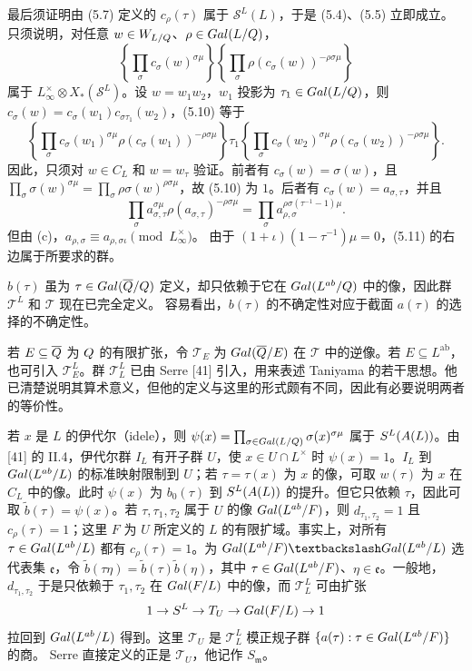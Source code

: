 最后须证明由 (5.7) 定义的 $c_\rho(\tau)$ 属于 $\mathcal S^L(L)$，于是 (5.4)、(5.5) 立即成立。只须说明，对任意
$w\in W_{L/Q}$、$\rho\in Gal(L/Q)$，
\begin{equation}
\left\{\prod_\sigma c_\sigma(w)^{\sigma\mu}\right\}
\left\{\prod_\sigma\rho(c_\sigma(w))^{-\rho\sigma\mu}\right\}
\tag{5.10}
\end{equation}
属于 $L_\infty^\times\otimes X_*(\mathcal S^L)$。设 $w=w_1w_2$，$w_1$ 投影为
$\tau_1\in Gal(L/Q)$，则 $c_\sigma(w)=c_\sigma(w_1)c_{\sigma\tau_1}(w_2)$，(5.10) 等于
\[
\left\{\prod_\sigma c_\sigma(w_1)^{\sigma\mu}
\rho(c_\sigma(w_1))^{-\rho\sigma\mu}\right\}
\tau_1\left\{\prod_\sigma c_\sigma(w_2)^{\sigma\mu}
\rho(c_\sigma(w_2))^{-\rho\sigma\mu}\right\}.
\]
因此，只须对 $w\in C_L$ 和 $w=w_\tau$ 验证。前者有
$c_\sigma(w)=\sigma(w)$，且
$\prod_\sigma\sigma(w)^{\sigma\mu}=\prod_\sigma\rho\sigma(w)^{\rho\sigma\mu}$，故 (5.10) 为
$1$。后者有 $c_\sigma(w)=a_{\sigma,\tau}$，并且
\begin{equation}
\prod_\sigma a_{\sigma,\tau}^{\sigma\mu}
\rho(a_{\sigma,\tau})^{-\rho\sigma\mu}
=\prod_\sigma a_{\rho,\sigma}^{\rho\sigma(\tau^{-1}-1)\mu}.\tag{5.11}
\end{equation}
但由 (c)，$a_{\rho,\sigma}\equiv a_{\rho,\sigma\iota}\pmod{L_\infty^\times}$。
由于 $(1+\iota)(1-\tau^{-1})\mu=0$，(5.11) 的右边属于所要求的群。

$b(\tau)$ 虽为 $\tau\in Gal(\overline{Q}/Q)$ 定义，却只依赖于它在
$Gal(L^{ab}/Q)$ 中的像，因此群 $\mathcal T^L$ 和 $\mathcal T$ 现在已完全定义。
容易看出，$b(\tau)$ 的不确定性对应于截面 $a(\tau)$ 的选择的不确定性。

若 $E\subseteq\overline{Q}$ 为 $Q$ 的有限扩张，令 $\mathcal T_E$ 为
$Gal(\overline{Q}/E)$ 在 $\mathcal T$ 中的逆像。若 $E\subseteq L^{\mathrm{ab}}$，也可引入
$\mathcal T_E^L$。群 $\mathcal T_L^L$ 已由 Serre [41] 引入，用来表述 Taniyama 的若干思想。他已清楚说明其算术意义，但他的定义与这里的形式颇有不同，因此有必要说明两者的等价性。

若 $x$ 是 $L$ 的伊代尔（idele），则
$\psi(x)=\prod_{\sigma\in Gal(L/Q)}\sigma(x)^{\sigma\mu}$ 属于
$S^L(A(L))$。由 [41] 的 II.4，伊代尔群 $I_L$ 有开子群 $U$，使
$x\in U\cap L^\times$ 时 $\psi(x)=1$。$I_L$ 到 $Gal(L^{ab}/L)$ 的标准映射限制到
$U$；若 $\tau=\tau(x)$ 为 $x$ 的像，可取 $w(\tau)$ 为 $x$ 在 $C_L$ 中的像。此时
$\psi(x)$ 为 $b_0(\tau)$ 到 $S^L(A(L))$ 的提升。但它只依赖 $\tau$，因此可取
$\widetilde b(\tau)=\psi(x)$。若 $\tau,\tau_1,\tau_2$ 属于 $U$ 的像
$Gal(L^{ab}/F)$，则 $d_{\tau_1,\tau_2}=1$ 且 $c_\rho(\tau)=1$；这里
$F$ 为 $U$ 所定义的 $L$ 的有限扩域。事实上，对所有
$\tau\in Gal(L^{ab}/L)$ 都有 $c_\rho(\tau)=1$。为
$\Gal(L^{\mathrm{ab}}/F)\backslash\Gal(L^{\mathrm{ab}}/L)$ 选代表集 $\mathfrak e$，令
$\widetilde b(\tau\eta)=\widetilde b(\tau)\widetilde b(\eta)$，其中
$\tau\in Gal(L^{ab}/F)$、$\eta\in\mathfrak e$。一般地，
$d_{\tau_1,\tau_2}$ 于是只依赖于 $\tau_1,\tau_2$ 在 $Gal(F/L)$ 中的像，而
$\mathcal T_L^L$ 可由扩张
\[
1\to S^L\to T_U\to Gal(F/L)\to1
\]
拉回到 $Gal(L^{ab}/L)$ 得到。这里 $\mathcal T_U$ 是
$\mathcal T_L^L$ 模正规子群 $\{a(\tau):\tau\in Gal(L^{ab}/F)\}$ 的商。
Serre 直接定义的正是 $\mathcal T_U$，他记作 $S_{\mathfrak m}$。

